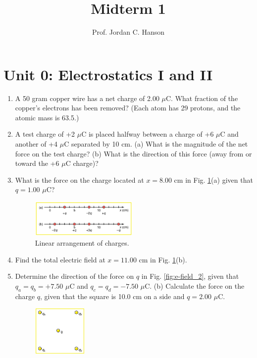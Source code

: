 \documentclass[12pt,twocolumn]{article}
\title{Midterm 1}
\author{Prof. Jordan C. Hanson}
\begin{document}
\maketitle
\small

\section{Unit 0: Electrostatics I and II}

\noindent
\begin{enumerate}
\item A 50 gram copper wire has a net charge of 2.00 $\mu$C. What fraction of the copper’s electrons has been removed? (Each atom has 29 protons, and the atomic mass is 63.5.) \\ \vspace{2cm}
\item A test charge of +2 $\mu$C is placed halfway between a charge of +6 $\mu$C and another of +4 $\mu$C separated by 10 cm. (a) What is the magnitude of the net force on the test charge? (b) What is the direction of this force (away from or toward the +6 $\mu$C charge)? \\ \vspace{3cm}
\item What is the force on the charge located at $x=8.00$ cm in Fig. \ref{fig:e-field_1}(a) given that $q=1.00$ $\mu$C?
\begin{figure}[hb]
\centering
\includegraphics[width=0.49\textwidth]{e-field_1.jpeg}
\caption{\label{fig:e-field_1} Linear arrangement of charges.}
\end{figure}
\item Find the total electric field at $x=11.00$ cm in Fig. \ref{fig:e-field_1}(b). \\ \vspace{5cm}
\item Determine the direction of the force on $q$ in Fig. \ref{fig:e-field_2}, given that $q_a=q_b=+7.50$ $\mu$C and $q_c = q_d = -7.50$ $\mu$C. (b) Calculate the force on the charge $q$, given that the square is 10.0 cm on a side and $q=2.00$ $\mu$C.
\begin{figure}[hb]
\centering
\includegraphics[width=0.25\textwidth]{e-field_2.jpeg}

\end{figure}
\end{enumerate}
\end{document}
